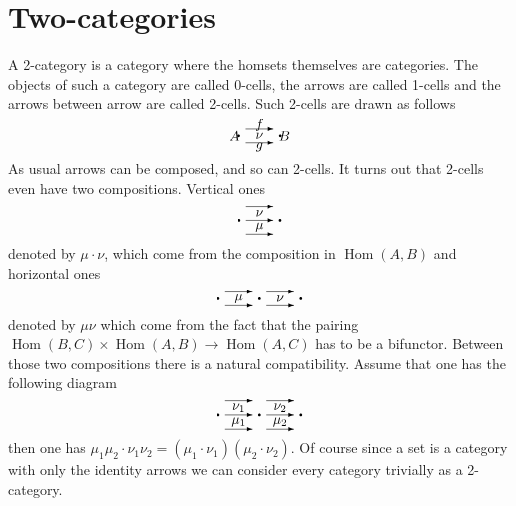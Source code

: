 \documentclass{amsproc}
\def\Hom{\operatorname {Hom}}
\def\r{\rightarrow}
\theoremstyle{definition}
\theoremstyle{remark}
\numberwithin{equation}{section}
\numberwithin{table}{section}
\numberwithin{figure}{section}
\begin{document}
\appendix
\section{Two-categories}
\label{ref:Aa}
A 2-category is a category where the homsets themselves
are categories. The objects of such a category are called 0-cells, the
arrows are called 1-cells and the arrows between arrow are called
2-cells. Such 2-cells are drawn as follows
\setlength{\unitlength}{1mm}
\thicklines
\[
\begin{picture}(40,20)
\put(2,10){\makebox(0,0){$A$}}
\put(38,10){\makebox(0,0){$B$}}
\put(20,2){\makebox(0,0){$g$}}
\put(20,18){\makebox(0,0){$f$}}
\put(20,10){\makebox(0,0){$\nu$}}
\put(10,5){\vector(1,0){20}}
\put(10,15){\vector(1,0){20}}
\put(5,10){\circle*{2}}
\put(35,10){\circle*{2}}
\end{picture}
\]
As usual arrows can be composed, and so can 2-cells. It turns out that
2-cells even have two compositions. Vertical ones
\[
\begin{picture}(30,20)
\put(5,0){\vector(1,0){20}}
\put(5,10){\vector(1,0){20}}
\put(5,20){\vector(1,0){20}}
\put(0,10){\circle*{2}}
\put(30,10){\circle*{2}}
\put(15,5){\makebox(0,0){$\mu$}}
\put(15,15){\makebox(0,0){$\nu$}}
\end{picture}
\]
denoted by $\mu\cdot \nu$, which come from the composition in
$\Hom(A,B)$ and horizontal ones
\[
\begin{picture}(60,10)
\put(0,5){\circle*{2}}
\put(30,5){\circle*{2}}
\put(60,5){\circle*{2}}
\put(15,5){\makebox(0,0){$\mu$}}
\put(45,5){\makebox(0,0){$\nu$}}
\put(5,0){\vector(1,0){20}}
\put(35,0){\vector(1,0){20}}
\put(5,10){\vector(1,0){20}}
\put(35,10){\vector(1,0){20}}
\end{picture}
\]
denoted by $\mu\nu$ which come from the fact that the pairing
$\Hom(B,C)\times \Hom(A,B)\r \Hom(A,C)$ has to be a bifunctor. Between
those two compositions there is a natural compatibility. Assume that
one has the following diagram
\[
\begin{picture}(60,20)
\put(5,0){\vector(1,0){20}}
\put(5,10){\vector(1,0){20}}
\put(5,20){\vector(1,0){20}}
\put(0,10){\circle*{2}}
\put(30,10){\circle*{2}}
\put(15,5){\makebox(0,0){$\mu_1$}}
\put(15,15){\makebox(0,0){$\nu_1$}}
\put(35,0){\vector(1,0){20}}
\put(35,10){\vector(1,0){20}}
\put(35,20){\vector(1,0){20}}
\put(60,10){\circle*{2}}
\put(45,5){\makebox(0,0){$\mu_2$}}
\put(45,15){\makebox(0,0){$\nu_2$}}
\end{picture}
\]
then one has
$\mu_1\mu_2\cdot\nu_1\nu_2=(\mu_1\cdot\nu_1)(\mu_2\cdot\nu_2)$.  Of
course since a set is a category with only the identity arrows we can
consider every category trivially as a 2-category.
\end{document}
